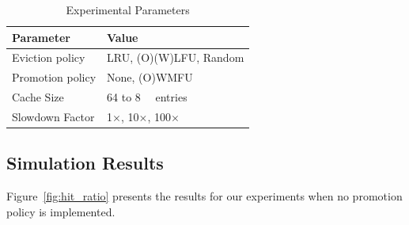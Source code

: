 \begin{table}[]
	\centering
	\caption{Experimental Parameters}
	\label{tab:setup}
	\begin{tabular}{l|l}
		\toprule
		\textbf{Parameter}       & \textbf{Value}   \\
		\midrule
		Eviction policy            & LRU, (O)(W)LFU, Random			    \\
		Promotion policy            & None, (O)WMFU			    \\
		Cache Size              & 64 to \SI{8}{\kilo\nothing} entries  \\
		Slowdown Factor         & 1$\times$, 10$\times$, 100$\times$        \\
		\bottomrule
	\end{tabular}
\end{table}

\subsection{Simulation Results}
Figure~\ref{fig:hit_ratio} presents the results for our experiments when no promotion policy is implemented.

